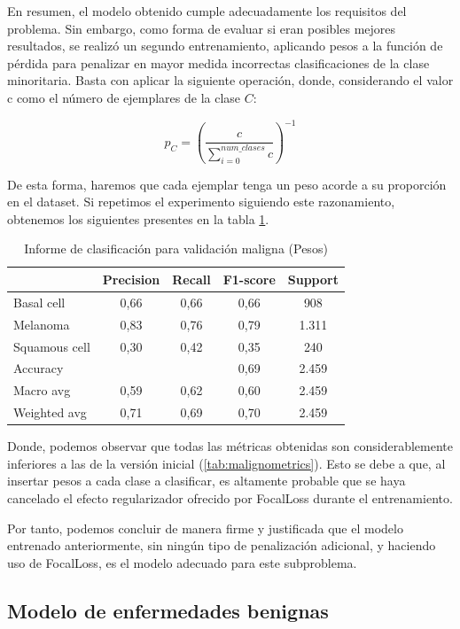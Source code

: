 En resumen, el modelo obtenido cumple adecuadamente los requisitos del problema. Sin embargo, como forma de evaluar si eran posibles mejores resultados, se realizó un segundo entrenamiento, aplicando pesos a la función de pérdida para penalizar en mayor medida incorrectas clasificaciones de la clase minoritaria. Basta con aplicar la siguiente operación, donde, considerando el valor c como el número de ejemplares de la clase $C$:

$$p_C =(\frac{c}{\sum_{i=0}^{num\_clases} c} )^{-1}$$

De esta forma, haremos que cada ejemplar tenga un peso acorde a su proporción en el dataset. Si repetimos el experimento siguiendo este razonamiento, obtenemos los siguientes presentes en la tabla \ref{tab:malignometrics2}.

\begin{table}[!ht]
	\centering
	\begin{tabular}{|l|c|c|c|c|}
		\hline
		& Precision & Recall & F1-score & Support \\
		\hline
		Basal cell & 0,66 & 0,66 & 0,66 & 908 \\
		Melanoma & 0,83 & 0,76 & 0,79 & 1.311 \\
		Squamous cell & 0,30 & 0,42 & 0,35 & 240 \\
		\hline
		Accuracy &  &  & 0,69 & 2.459 \\
		Macro avg & 0,59& 0,62& 0,60&2.459\\
		Weighted avg&0,71&0,69&0,70&2.459\\
		\hline
	\end{tabular}
	\caption{Informe de clasificación para validación maligna (Pesos)}
	\label{tab:malignometrics2}
\end{table}


Donde, podemos observar que todas las métricas obtenidas son considerablemente inferiores a las de la versión inicial (\ref{tab:malignometrics}). Esto se debe a que, al insertar pesos a cada clase a clasificar, es altamente probable que se haya cancelado el efecto regularizador ofrecido por FocalLoss durante el entrenamiento.

Por tanto, podemos concluir de manera firme y justificada que el modelo entrenado anteriormente, sin ningún tipo de penalización adicional, y haciendo uso de FocalLoss, es el modelo adecuado para este subproblema.

\subsection{Modelo de enfermedades benignas}

